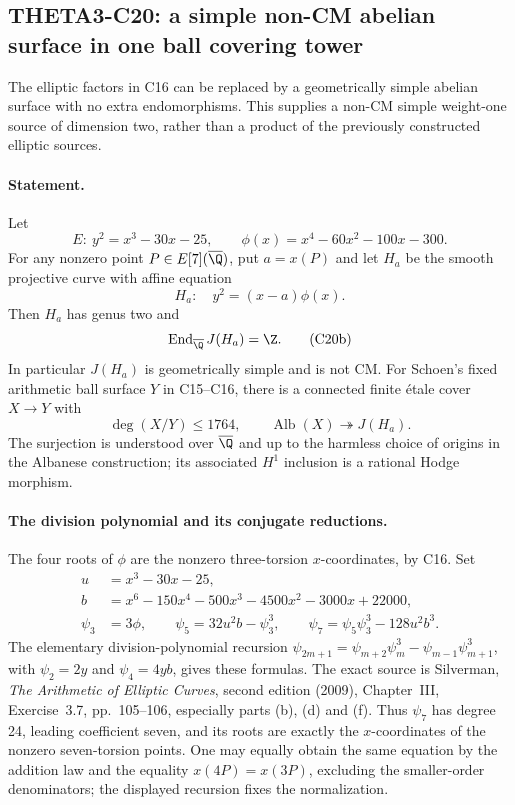 \subsection{THETA3-C20: a simple non-CM abelian surface in one ball covering tower}\label{C20}

The elliptic factors in C16 can be replaced by a geometrically
simple abelian surface with no extra endomorphisms. This supplies a
non-CM simple weight-one source of dimension two, rather than a
product of the previously constructed elliptic sources.

\paragraph{Statement.}
Let
\[
 E:\ y^2=x^3-30x-25,\qquad
 \phi(x)=x^4-60x^2-100x-300.
\]
For any nonzero point $P\in E[7](\overline{\Q})$, put $a=x(P)$
and let $H_a$ be the smooth projective curve with affine equation
\[
 H_a:\quad y^2=(x-a)\phi(x).
 \tag{C20a}
\]
Then $H_a$ has genus two and
\[
 \operatorname{End}_{\overline{\Q}}J(H_a)=\Z.
 \tag{C20b}
\]
In particular $J(H_a)$ is geometrically simple and is not CM.
For Schoen's fixed arithmetic ball surface $Y$ in C15--C16, there
is a connected finite \'etale cover $X\to Y$ with
\[
 \deg(X/Y)\leq1764,\qquad
 \operatorname{Alb}(X)\twoheadrightarrow J(H_a).
 \tag{C20c}
\]
The surjection is understood over $\overline{\Q}$ and up to the
harmless choice of origins in the Albanese construction; its
associated $H^1$ inclusion is a rational Hodge morphism.

\paragraph{The division polynomial and its conjugate reductions.}
The four roots of $\phi$ are the nonzero three-torsion
$x$-coordinates, by C16. Set
\begin{align*}
 u&=x^3-30x-25,\\
 b&=x^6-150x^4-500x^3-4500x^2-3000x+22000,\\
 \psi_3&=3\phi,\qquad
 \psi_5=32u^2b-\psi_3^3,\qquad
 \psi_7=\psi_5\psi_3^3-128u^2b^3.
\end{align*}
The elementary division-polynomial recursion
$\psi_{2m+1}=\psi_{m+2}\psi_m^3-
\psi_{m-1}\psi_{m+1}^3$, with $\psi_2=2y$ and
$\psi_4=4yb$, gives these formulas. The exact source is
Silverman, \emph{The Arithmetic of Elliptic Curves},
second edition (2009), Chapter~III, Exercise~3.7,
pp.~105--106, especially parts (b), (d) and (f).
Thus $\psi_7$ has degree
24, leading coefficient seven, and its roots are exactly the
$x$-coordinates of the nonzero seven-torsion points.
One may equally obtain the same equation by the addition law
and the equality $x(4P)=x(3P)$, excluding the smaller-order
denominators; the displayed recursion fixes the normalization.

